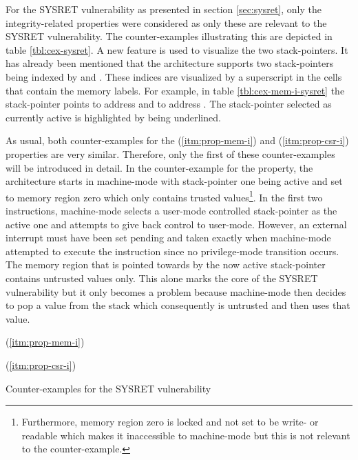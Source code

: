 For the SYSRET vulnerability as presented in section \ref{sec:sysret}, only the integrity-related properties were considered as only these are relevant to the SYSRET vulnerability.
The counter-examples illustrating this are depicted in table \ref{tbl:cex-sysret}.
A new feature is used to visualize the two stack-pointers.
It has already been mentioned that the architecture supports two stack-pointers being indexed by  and .
These indices are visualized by a superscript in the cells that contain the memory labels.
For example, in table \ref{tbl:cex-mem-i-sysret} the stack-pointer  points to address  and  to address .
The stack-pointer selected as currently active is highlighted by being underlined.

As usual, both counter-examples for the  (\ref{itm:prop-mem-i}) and  (\ref{itm:prop-csr-i}) properties are very similar.
Therefore, only the first of these counter-examples will be introduced in detail.
In the counter-example for the  property, the architecture starts in machine-mode with stack-pointer one being active and set to memory region zero which only contains trusted values\footnote{%
    Furthermore, memory region zero is locked and not set to be write- or readable which makes it inaccessible to machine-mode but this is not relevant to the counter-example.
}.
In the first two instructions, machine-mode selects a user-mode controlled stack-pointer as the active one and attempts to give back control to user-mode.
However, an external interrupt must have been set pending and taken exactly when machine-mode attempted to execute the  instruction since no privilege-mode transition occurs.
The memory region that is pointed towards by the now active stack-pointer contains untrusted values only.
This alone marks the core of the SYSRET vulnerability but it only becomes a problem because machine-mode then decides to pop a value from the stack which consequently is untrusted and then uses that value.

\begin{table}
    \begin{subtable}{\textwidth}
        \centering
        
        \caption{ (\ref{itm:prop-mem-i})}
        \label{tbl:cex-mem-i-sysret}
    \end{subtable}

    \begin{subtable}{\textwidth}
        \centering
        
        \caption{ (\ref{itm:prop-csr-i})}
        \label{tbl:cex-csr-i-sysret}
    \end{subtable}
    \caption{Counter-examples for the SYSRET vulnerability}
    \label{tbl:cex-sysret}
\end{table}
